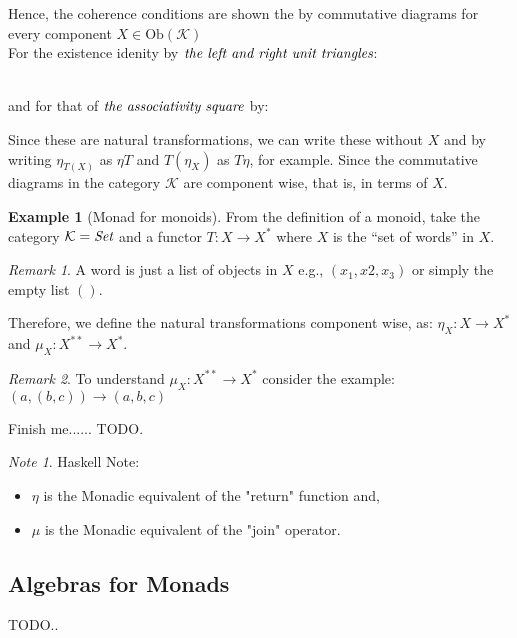 \documentclass[10pt, oneside, reqno]{amsart}
\theoremstyle{plain}%
\theoremstyle{definition}
\newtheorem{exmp}[thm]{Example}
\theoremstyle{remark}
\newtheorem*{rem}{Remark}
\newtheorem*{note}{Note}
\begin{document}
Hence, the coherence conditions are shown the by commutative diagrams for every component $X \in \text{Ob}(\mathcal{K})$
\\
For the existence idenity by $\emph{the left and right unit triangles}$:
\\
and for that of $\emph{the associativity square}$ by:
Since these are natural transformations,
we can write these without $X$ and by writing $\eta_{T(X)}$ as $\eta T$ and $T(\eta_{X})$ as $T \eta$, for example.
Since the commutative diagrams in the category $\mathcal{K}$ are component wise, that is, in terms of $X$.

\begin{exmp}[Monad for monoids]
 From the definition of a monoid,
 take the category $\mathcal{K} = \emph{Set}$ and a functor $T: X \to X^{*}$ where $X$ is the ``set of words'' in $X$.
 \begin{rem}
  A word is just a list of objects in $X$ e.g., $(x_{1}, x{2}, x_{3})$ or simply the empty list $()$.
 \end{rem}
 Therefore, we define the natural transformations component wise, as: $\eta_{X}: X \to X^{*}$ and $\mu_{X}: X^{**} \to X^{*}$.
 \begin{rem}
  To understand $\mu_{X}: X^{**} \to X^{*}$ consider the example: $(a, (b, c)) \to (a, b, c)$
 \end{rem}
 Finish me...... TODO.
\end{exmp}

\begin{note}
Haskell Note:
\begin{itemize}
 \item $\eta$ is the Monadic equivalent of the "return" function and,
 \item $\mu$ is the Monadic equivalent of the "join" operator.
\end{itemize}
\end{note}


\subsection{Algebras for Monads} %
\label{sec:monadalgebra}
TODO..
\end{document}
